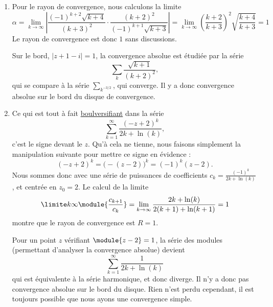 \documentclass[12pt,french,oneside,a4paper]{memoir} %
\begin{document}
\begin{exo}
\begin{correction}
\begin{enumerate}
\item
Pour le rayon de convergence, nous calculons la limite
\begin{equation}
	\alpha=\lim_{k\to\infty}\left| \frac{ (-1)^{k+2}\sqrt{k+4} }{ (k+3)^2 }\cdot\frac{ (k+2)^2 }{ (-1)^{k+1}\sqrt{k+3} } \right| =\lim_{k\to \infty}\left( \frac{ k+2 }{ k+3 } \right)^2\sqrt{\frac{ k+4 }{ k+3 }}=1
\end{equation}
Le rayon de convergence est donc $1$ sans discussions.

Sur le bord, $| z+1-i |=1$, la convergence absolue est étudiée par la série
\begin{equation}
	\sum_k\frac{ \sqrt{k+1} }{ (k+2)^2 },
\end{equation}
qui se compare à la série $\sum_{k^{-3/2}}$, qui converge. Il y a donc convergence absolue sur le bord du disque de convergence.

\item
Ce qui est tout à fait \href{http://www.youtube.com/watch?v=5O2bOElnbOQ}{boulversifiant} dans la série
\begin{equation*}
	\sum_{k=1}^\infty \frac{{(-z + 2)}^k}{2k + \ln(k)},
\end{equation*}
c'est le signe devant le $z$. Qu'à cela ne tienne, nous faisons simplement la manipulation suivante pour mettre ce signe en évidence :
\begin{equation}
	(-z+2)^k=\big( -(z-2) \big)^k=(-1)^k(z-2).
\end{equation}
Nous sommes donc avec une série de puissances de coefficients $c_k = \frac{ (-1)^k }{ 2k+\ln(k) }$, et centrée en $z_0 = 2$. Le calcul de la limite
\begin{equation*}
	\limite k \infty \module{\frac{c_{k+1}}{c_k}}=\lim_{k\to\infty}\frac{ 2k+\ln(k) }{ 2(k+1)+\ln(k+1) }=1
\end{equation*}
montre que le rayon de convergence est $R = 1$.

Pour un point $z$ vérifiant $\module{z-2} = 1$, la série des modules (permettant d'analyser la convergence absolue) devient
\begin{equation*}
\sum_{k=1}^\infty \frac{1}{2k + \ln(k)}
\end{equation*}
qui est équivalente à la série harmonique, et donc diverge. Il n'y a donc pas convergence absolue sur le bord du disque. Rien n'est perdu cependant, il est toujours possible que nous ayons une convergence simple.


\end{enumerate}
\end{correction}
\end{exo}
\end{document}
